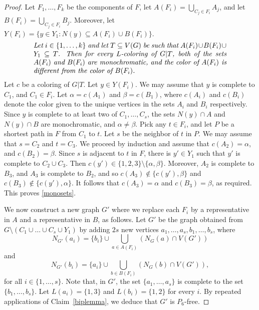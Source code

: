 \documentclass[11pt]{article}
\begin{document}
\begin{proof}
Let $F_1, \ldots, F_k$ be the components of $F$, let 
$A(F_i)=\bigcup_{C_j \in F_i} A_j$, and let $B(F_i)=\bigcup_{C_j \in F_i}B_j$. 
Moreover, let
$Y(F_i)=\{y \in Y_1 : N(y) \subseteq A(F_i) \cup B(F_i)\}$.
\begin{equation}\label{monosets}
\begin{minipage}[c]{0.8\textwidth}\em
Let $i \in \{1, \ldots, k\}$ and let $T \subseteq V(G)$ be such that 
$A(F_i) \cup B(F_i) \cup Y_1 \subseteq T$. Then 
	for every $L$-coloring of $G|T$, both of the sets
$A(F_i)$ and $B(F_i)$ are monochromatic, and the color of $A(F_i)$ is different
from the color of $B(F_i)$. 
\end{minipage}
\end{equation}
Let $c$ be a coloring of $G|T$.
Let $y \in Y(F_i)$.
We may assume that $y$ is complete to $C_1$, and $C_1 \in F_i$.
Let $\alpha =c(A_1)$ and $\beta =c(B_1)$, where $c(A_i)$ and $c(B_i)$ denote the color given to the unique vertices in the sets $A_i$ and $B_i$ respectively.
Since $y$ is complete to at least two of $C_1, \ldots, C_s$, the sets $N(y) \cap A$ and $N(y) \cap B$ are monochromatic, and $\alpha \neq \beta$.
Pick any $t \in F_i$, and let $P$ be a shortest path in $F$ from $C_1$ to $t$.
Let $s$ be the neighbor of $t$ in $P$. 
We may assume that $s=C_2$ and $t=C_3$.
We proceed by induction and assume that $c(A_2)=\alpha$, and $c(B_2)=\beta$.
Since $s$ is adjacent to $t$ in $F$,  there is $y' \in Y_1$ such that $y'$ is complete to $C_2 \cup C_3$.
Then $c(y') \in \{1,2,3\} \setminus \{\alpha,\beta\}$. 
Moreover, $A_2$ is complete to $B_3$, and $A_3$ is complete to $B_2$, and so $c(A_3) \notin \{ c(y'), \beta\}$ and $c(B_3) \notin \{c(y'), \alpha\}$.
It follows that $c(A_3)=\alpha$ and $c(B_3)=\beta$, as required.
This proves \eqref{monosets}.
\bigskip

We now construct a new graph $G'$ where we replace each $F_i$ by a representative in $A$ and a representative in $B$, as follows.
Let $G'$ be the graph obtained from $G \setminus (C_1 \cup \ldots \cup C_s \cup Y_1)$ by adding $2s$ new vertices $a_1,\ldots,a_s,b_1, \ldots, b_s$, where
$$N_{G'}(a_i)=\{b_i\} \cup \bigcup_{a \in A(F_i)}(N_G(a) \cap V(G'))$$ 
and $$N_{G'}(b_i)=\{a_i\} \cup \bigcup_{b \in B(F_i) } (N_G(b) \cap V(G')),$$
for all $i \in \{1,\ldots,s\}$. 
Note that, in $G'$, the set $\{a_1,\ldots,a_s\}$ is complete to the set $\{b_1,\ldots, b_s\}$.
Let $L(a_i)=\{1,3\}$ and $L(b_i)=\{1,2\}$ for every $i$.
By repeated applications of Claim~\ref{biplemma}, we deduce that $G'$ is $P_6$-free.


\end{proof}
\end{document}
